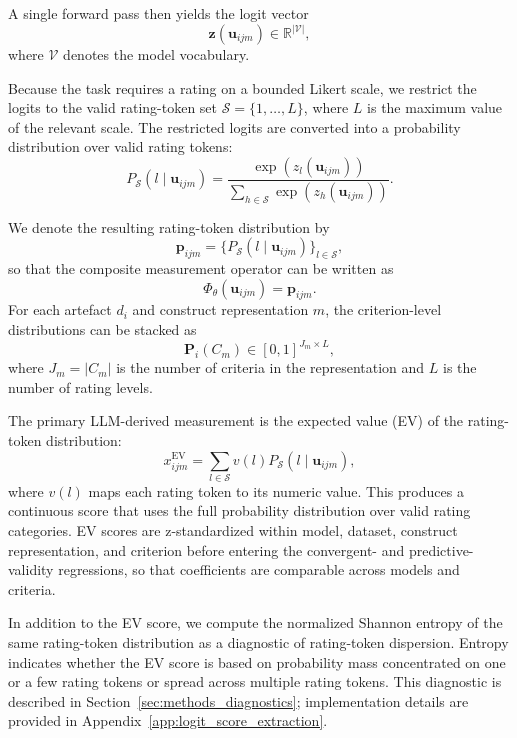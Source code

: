 A single forward pass then yields the logit vector
\[
    \mathbf{z}(\mathbf{u}_{ijm}) \in \mathbb{R}^{|\mathcal{V}|},
\]
where $\mathcal{V}$ denotes the model vocabulary.

Because the task requires a rating on a bounded Likert scale, we restrict the logits to the valid rating-token set $\mathcal{S}=\{1,\ldots,L\}$, where $L$ is the maximum value of the relevant scale. The restricted logits are converted into a probability distribution over valid rating tokens:
\begin{equation}
P_{\mathcal{S}}(l \mid \mathbf{u}_{ijm}) =
\frac{\exp(z_l(\mathbf{u}_{ijm}))}
{\sum_{h \in \mathcal{S}} \exp(z_h(\mathbf{u}_{ijm}))}.
\end{equation}

We denote the resulting rating-token distribution by
\[
    \mathbf{p}_{ijm}
    =
    \{P_{\mathcal{S}}(l \mid \mathbf{u}_{ijm})\}_{l \in \mathcal{S}},
\]
so that the composite measurement operator can be written as
\[
    \Phi_\theta(\mathbf{u}_{ijm}) = \mathbf{p}_{ijm}.
\]
For each artefact $d_i$ and construct representation $m$, the criterion-level distributions can be stacked as
\[
    \mathbf{P}_i(C_m) \in [0,1]^{J_m \times L},
\]
where $J_m = |C_m|$ is the number of criteria in the representation and $L$ is the number of rating levels.

The primary LLM-derived measurement is the expected value (EV) of the rating-token distribution:
\begin{equation}\label{eq:weighted_score}
x_{ijm}^{\mathrm{EV}} =
\sum_{l \in \mathcal{S}} v(l) P_{\mathcal{S}}(l \mid \mathbf{u}_{ijm}),
\end{equation}
where $v(l)$ maps each rating token to its numeric value. This produces a continuous score that uses the full probability distribution over valid rating categories. EV scores are z-standardized within model, dataset, construct representation, and criterion before entering the convergent- and predictive-validity regressions, so that coefficients are comparable across models and criteria.

In addition to the EV score, we compute the normalized Shannon entropy of the same rating-token distribution as a diagnostic of rating-token dispersion. Entropy indicates whether the EV score is based on probability mass concentrated on one or a few rating tokens or spread across multiple rating tokens. This diagnostic is described in Section~\ref{sec:methods_diagnostics}; implementation details are provided in Appendix~\ref{app:logit_score_extraction}.


